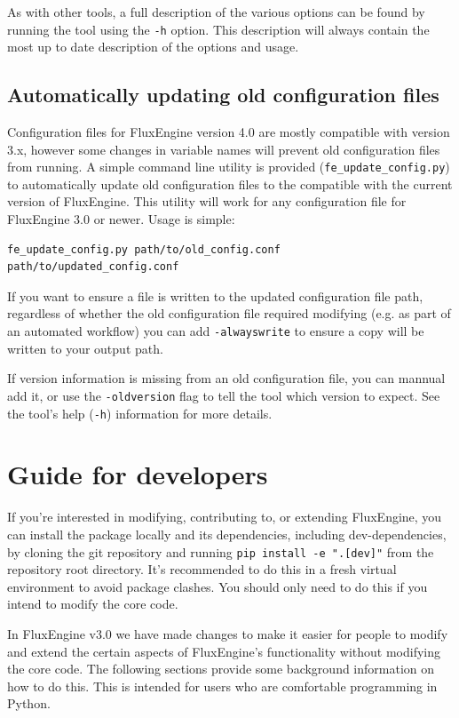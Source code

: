 \documentclass[]{scrartcl}
\begin{document}
As with other tools, a full description of the various options can be found by running the tool using the \texttt{-h} option. This description will always contain the most up to date description of the options and usage.


\subsection{Automatically updating old configuration files} \label{updating_configuration_files}
Configuration files for FluxEngine version 4.0 are mostly compatible with version 3.x, however some changes in variable names will prevent old configuration files from running. A simple command line utility is provided (\texttt{fe\_update\_config.py}) to automatically update old configuration files to the compatible with the current version of FluxEngine. This utility will work for any configuration file for FluxEngine 3.0 or newer. Usage is simple:
\begin{lstlisting}
fe_update_config.py path/to/old_config.conf path/to/updated_config.conf
\end{lstlisting}

If you want to ensure a file is written to the updated configuration file path, regardless of whether the old configuration file required modifying (e.g. as part of an automated workflow) you can add \texttt{-alwayswrite} to ensure a copy will be written to your output path.

If version information is missing from an old configuration file, you can mannual add it, or use the \texttt{-oldversion} flag to tell the tool which version to expect. See the tool's help (\texttt{-h}) information for more details.


\section{Guide for developers} \label{developer_notes}
If you're interested in modifying, contributing to, or extending FluxEngine, you can install the package locally and its dependencies, including dev-dependencies, by cloning the git repository and running \texttt{pip install -e ".[dev]"} from the repository root directory. It's recommended to do this in a fresh virtual environment to avoid package clashes. You should only need to do this if you intend to modify the core code.

In FluxEngine v3.0 we have made changes to make it easier for people to modify and extend the certain aspects of FluxEngine's functionality without modifying the core code. The following sections provide some background information on how to do this. This is intended for users who are comfortable programming in Python.
\end{document}
